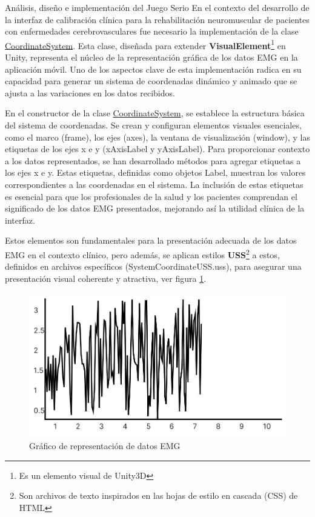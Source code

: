 \begin{thesischapter}{2} {Análisis, diseño e implementación del Juego Serio}
    En el contexto del desarrollo de la interfaz de calibración clínica para la rehabilitación neuromuscular de pacientes con enfermedades cerebrovasculares
    fue necesario la implementación de la clase \underline{CoordinateSystem}. Esta clase, diseñada para extender \textbf{VisualElement}\footnote{Es un elemento visual de Unity3D } en Unity, representa el núcleo de la representación 
    gráfica de los datos EMG en la aplicación móvil. Uno de los aspectos clave de esta implementación 
    radica en su capacidad para generar un sistema de coordenadas dinámico y animado que se ajusta a las variaciones en los datos recibidos.

    \vspace{10pt}
    En el constructor de la clase \underline{CoordinateSystem}, se establece la estructura básica del sistema de coordenadas. Se crean y configuran elementos visuales esenciales, como el 
    marco (frame), los ejes (axes), la ventana de visualización (window), y las etiquetas de los ejes x e y (xAxisLabel y yAxisLabel). Para proporcionar contexto a los datos 
    representados, se han desarrollado métodos para agregar etiquetas a los ejes x e y. Estas etiquetas, definidas como objetos Label, muestran los 
    valores correspondientes a las coordenadas en el sistema. La inclusión de estas etiquetas es esencial para que los profesionales de la salud y los pacientes 
    comprendan el significado de los datos EMG presentados, mejorando así la utilidad clínica de la interfaz. 
    
    \vspace{5pt}
    Estos elementos son fundamentales para la presentación adecuada de los datos EMG en el contexto clínico, pero además, se aplican estilos \textbf{USS}\footnote{Son archivos de texto inspirados en las hojas de estilo en cascada (CSS) de HTML} a estos, definidos en archivos específicos (SystemCoordinateUSS.uss), para asegurar una 
    presentación visual coherente y atractiva, ver figura \ref{fig: graph-emg}.

    \begin{figure}[ht]
        \centering
        \includegraphics[scale=0.25]{images/emg-graph.jpg}
        \caption{Gráfico de representación de datos EMG}
        \label{fig: graph-emg}
    \end{figure}


\end{thesischapter}
